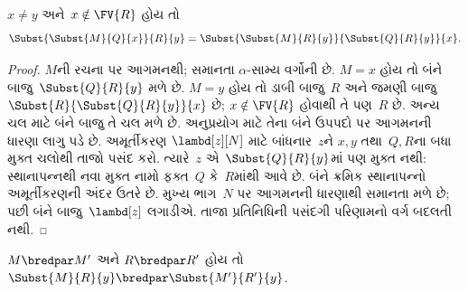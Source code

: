 \documentclass[../../../include/open-logic-section]{subfiles}
\begin{document}
\begin{lem}
  $x\neq y$ અને~$x\notin\FV{R}$ હોય તો
  \[
  \Subst{\Subst{M}{Q}{x}}{R}{y}
  =
  \Subst{\Subst{M}{R}{y}}{\Subst{Q}{R}{y}}{x}.
  \]
\end{lem}
\begin{proof}
  $M$ની રચના પર આગમનથી; સમાનતા $\alpha$-સામ્ય વર્ગોની છે.
  $M=x$ હોય તો બંને બાજુ~$\Subst{Q}{R}{y}$ મળે છે.
  $M=y$ હોય તો ડાબી બાજુ~$R$ અને જમણી બાજુ
  $\Subst{R}{\Subst{Q}{R}{y}}{x}$ છે; $x\notin\FV{R}$
  હોવાથી તે પણ~$R$ છે. અન્ય ચલ માટે બંને બાજુ તે ચલ મળે છે.
  અનુપ્રયોગ માટે તેના બંને ઉપપદો પર આગમનની ધારણા લાગુ પડે છે.
  અમૂર્તીકરણ $\lambd[z][N]$ માટે બાંધનાર~$z$ને
  $x,y$ તથા~$Q,R$ના બધા મુક્ત ચલોથી તાજો પસંદ કરો.
  ત્યારે~$z$ એ~$\Subst{Q}{R}{y}$માં પણ મુક્ત નથી:
  સ્થાનાપન્નથી નવા મુક્ત નામો ફક્ત~$Q$ કે~$R$માંથી આવે છે.
  બંને ક્રમિક સ્થાનાપન્નો અમૂર્તીકરણની અંદર ઉતરે છે.
  મુખ્ય ભાગ~$N$ પર આગમનની ધારણાથી સમાનતા મળે છે;
  પછી બંને બાજુ~$\lambd[z]$ લગાડીએ.
  તાજા પ્રતિનિધિની પસંદગી પરિણામનો વર્ગ બદલતી નથી.
\end{proof}

\begin{lem}
  $M \bredpar M'$ અને $R \bredpar R'$ હોય તો
  $\Subst{M}{R}{y} \bredpar
  \Subst{M'}{R'}{y}$.
\end{lem}
\end{document}
